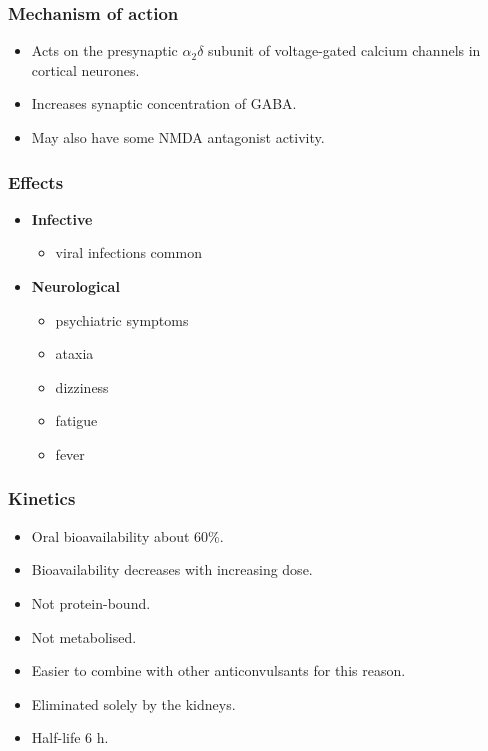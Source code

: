\documentclass[11pt,a4paper]{article}
\begin{document}
\subsubsection{Mechanism of action}
\begin{itemize}
  \item Acts on the presynaptic $\alpha_2\delta$ subunit of voltage-gated calcium channels in cortical neurones.
  \item Increases synaptic concentration of GABA.
  \item May also have some NMDA antagonist activity.
\end{itemize}

\subsubsection{Effects}
\begin{itemize}
  \item \textbf{Infective}
  \begin{itemize}
    \item viral infections common
  \end{itemize}
  \item \textbf{Neurological}
  \begin{itemize}
    \item psychiatric symptoms
    \item ataxia
    \item dizziness
    \item fatigue
    \item fever
  \end{itemize}
\end{itemize}

\subsubsection{Kinetics}
\begin{itemize}
  \item Oral bioavailability about 60\%.
  \item Bioavailability decreases with increasing dose.
  \item Not protein-bound.
  \item Not metabolised.
  \item Easier to combine with other anticonvulsants for this reason.
  \item Eliminated solely by the kidneys.
  \item Half-life 6 h.
\end{itemize}
\end{document}
